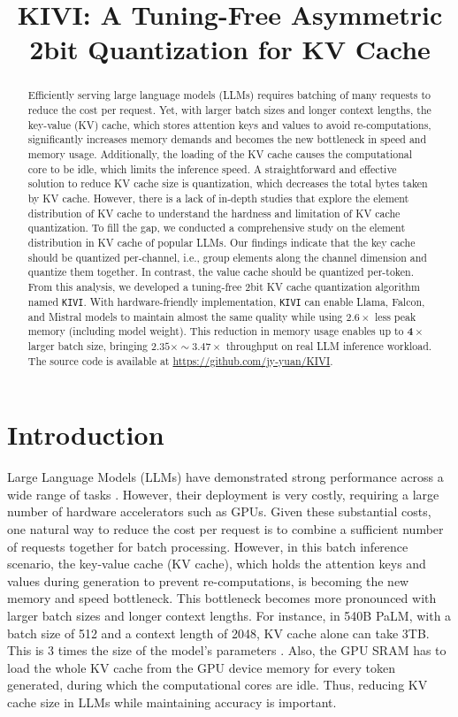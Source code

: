 \title{KIVI: A Tuning-Free Asymmetric 2bit Quantization for KV Cache}

\begin{abstract}
Efficiently serving large language models (LLMs) requires batching of many requests to reduce the cost per request. Yet, with larger batch sizes and longer context lengths, the key-value (KV) cache, which stores attention keys and values to avoid re-computations, significantly increases memory demands and becomes the new bottleneck in speed and memory usage. Additionally, the loading of the KV cache causes the computational core to be idle, which limits the inference speed. A straightforward and effective solution to reduce KV cache size is quantization, which decreases the total bytes taken by KV cache. However, there is a lack of in-depth studies that explore the element distribution of KV cache to understand the hardness and limitation of KV cache quantization. 
\quad
To fill the gap, we conducted a comprehensive study on the element distribution in KV cache of popular LLMs. Our findings indicate that the key cache should be quantized per-channel, i.e., group elements along the channel dimension and quantize them together. In contrast, the value cache should be quantized per-token. From this analysis, we developed a tuning-free 2bit KV cache quantization algorithm named \texttt{KIVI}. With hardware-friendly implementation, \texttt{KIVI} can enable Llama, Falcon, and Mistral models to maintain almost the same quality while using $\mathbf{2.6\times}$ less peak memory (including model weight). This reduction in memory usage enables up to $\mathbf{4\times}$ larger batch size, bringing $\mathbf{2.35\times \sim 3.47\times}$ throughput on real LLM inference workload. The source code is available at \url{https://github.com/jy-yuan/KIVI}.
\end{abstract}

\section{Introduction}

Large Language Models (LLMs) have demonstrated strong performance across a wide range of tasks \citep{gpt3,taylor2022galactica,yuan2023large,chuang2024understanding}. However, their deployment is very costly, requiring a large number of hardware accelerators such as GPUs. Given these substantial costs, one natural way to reduce the cost per request is to combine a sufficient number of requests together for batch processing. However, in this batch inference scenario, the key-value cache (KV cache), which holds the attention keys and values during generation to prevent re-computations, is becoming the new memory and speed bottleneck. This bottleneck becomes more pronounced with larger batch sizes and longer context lengths. For instance, in 540B PaLM, with a batch size of 512 and a context length of 2048, KV cache alone can take 3TB. This is 3 times the size of the model's parameters \citep{pope2023efficiently}. Also, the GPU SRAM has to load the whole KV cache from the GPU device memory for every token generated, during which the computational cores are idle. Thus, reducing KV cache size in LLMs while maintaining accuracy is important.

